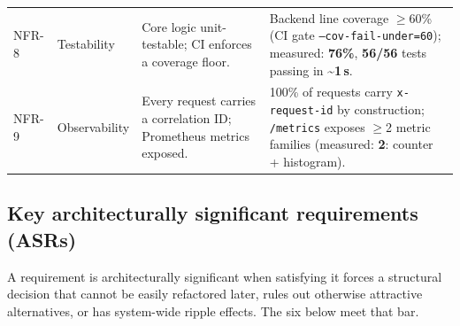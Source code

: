 \documentclass[11pt]{article}
\begin{document}
\begin{longtable}{p{1.2cm} p{2.5cm} p{4.8cm} p{5.0cm}}
  NFR-8 & Testability
        & Core logic unit-testable; CI enforces a coverage floor.
        & Backend line coverage $\geq$60\% (CI gate \texttt{--cov-fail-under=60});
          measured: \textbf{76\%}, \textbf{56/56} tests passing in \textbf{\textasciitilde{}1\,s}. \\[2pt]

  NFR-9 & Observability
        & Every request carries a correlation ID;
          Prometheus metrics exposed.
        & 100\% of requests carry \texttt{x-request-id} by construction;
          \texttt{/metrics} exposes $\geq$2 metric families
          (measured: \textbf{2}: counter + histogram). \\

  \bottomrule
\end{longtable}

\subsection{Key architecturally significant requirements (ASRs)}
A requirement is architecturally significant when satisfying it forces a structural decision that
cannot be easily refactored later, rules out otherwise attractive alternatives, or has
system-wide ripple effects. The six below meet that bar.
\end{document}
